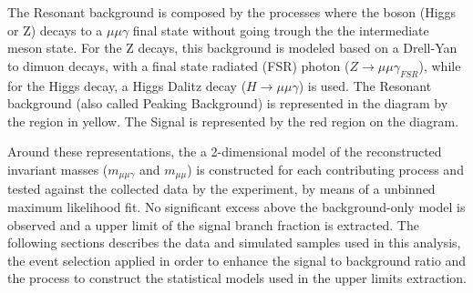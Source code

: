The Resonant background is composed by the processes where the boson (Higgs or Z) decays to a $\mu\mu\gamma$ final state without going trough the the intermediate meson state. For the Z decays, this background is modeled based on a Drell-Yan to dimuon decays, with a final state radiated (FSR) photon ($Z \rightarrow \mu\mu\gamma_{FSR}$), while for the Higgs decay, a  Higgs Dalitz decay ($H \rightarrow \mu\mu\gamma$) is used. The Resonant background (also called Peaking Background) is represented in the diagram by the region in yellow. The Signal is represented by the red region on the diagram.

Around these representations, the a 2-dimensional model of the reconstructed invariant masses ($m_{\mu\mu\gamma}$ and $m_{\mu\mu}$) is constructed for each contributing process and tested against the collected data by the experiment, by means of a unbinned maximum likelihood fit. No significant excess above the background-only model is observed and a upper limit of the signal branch fraction is extracted. The following sections describes the data and simulated samples used in this analysis, the event selection applied in order to enhance the signal to background ratio and the process to construct the statistical models used in the upper limits extraction.
